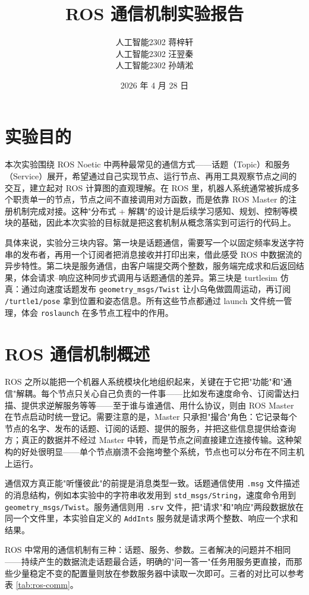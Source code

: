 \documentclass[11pt,a4paper,fontset=fandol]{ctexart}
\title{\bfseries ROS 通信机制实验报告}
\author{人工智能2302 \quad 蒋梓轩\\
人工智能2302 \quad 汪翌秦\\
人工智能2302 \quad 孙靖淞}
\date{2026 年 4 月 28 日}
\begin{document}
\maketitle

\section{实验目的}

本次实验围绕 ROS Noetic 中两种最常见的通信方式——话题（Topic）和服务（Service）展开，希望通过自己实现节点、运行节点、再用工具观察节点之间的交互，建立起对 ROS 计算图的直观理解。在 ROS 里，机器人系统通常被拆成多个职责单一的节点，节点之间不直接调用对方函数，而是依靠 ROS Master 的注册机制完成对接。这种"分布式 + 解耦"的设计是后续学习感知、规划、控制等模块的基础，因此本次实验的目标就是把这套机制从概念落实到可运行的代码上。

具体来说，实验分三块内容。第一块是话题通信，需要写一个以固定频率发送字符串的发布者，再用一个订阅者把消息接收并打印出来，借此感受 ROS 中数据流的异步特性。第二块是服务通信，由客户端提交两个整数，服务端完成求和后返回结果，体会请求--响应这种同步式调用与话题通信的差异。第三块是 turtlesim 仿真：通过向速度话题发布 \verb|geometry_msgs/Twist| 让小乌龟做圆周运动，再订阅 \verb|/turtle1/pose| 拿到位置和姿态信息。所有这些节点都通过 launch 文件统一管理，体会 \verb|roslaunch| 在多节点工程中的作用。

\section{ROS 通信机制概述}

ROS 之所以能把一个机器人系统模块化地组织起来，关键在于它把"功能"和"通信"解耦。每个节点只关心自己负责的一件事——比如发布速度命令、订阅雷达扫描、提供求逆解服务等等——至于谁与谁通信、用什么协议，则由 ROS Master 在节点启动时统一登记。需要注意的是，Master 只承担"撮合"角色：它记录每个节点的名字、发布的话题、订阅的话题、提供的服务，并把这些信息提供给查询方；真正的数据并不经过 Master 中转，而是节点之间直接建立连接传输。这种架构的好处很明显——单个节点崩溃不会拖垮整个系统，节点也可以分布在不同主机上运行。

通信双方真正能"听懂彼此"的前提是消息类型一致。话题通信使用 \verb|.msg| 文件描述的消息结构，例如本实验中的字符串收发用到 \verb|std_msgs/String|，速度命令用到 \verb|geometry_msgs/Twist|。服务通信则用 \verb|.srv| 文件，把"请求"和"响应"两段数据放在同一个文件里，本实验自定义的 \verb|AddInts| 服务就是请求两个整数、响应一个求和结果。

ROS 中常用的通信机制有三种：话题、服务、参数。三者解决的问题并不相同——持续产生的数据流走话题最合适，明确的"问一答一"任务用服务更直接，而那些少量稳定不变的配置量则放在参数服务器中读取一次即可。三者的对比可以参考表 \ref{tab:ros-comm}。
\end{document}
